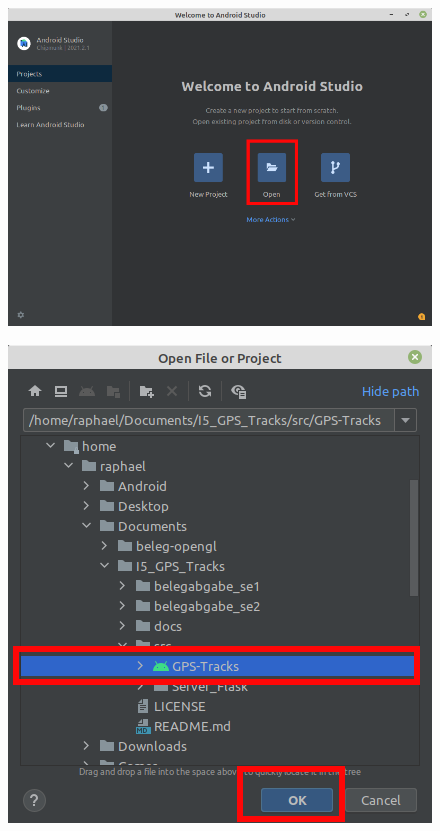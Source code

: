\documentclass{article}
\begin{document}
\begin{enumerate}
        \begin{minipage}{0.6\textwidth}
        \begin{figure}[H]
            \includegraphics[scale=0.3]{8.png}
        \end{figure}
        \end{minipage}
        \begin{minipage}{0.4\textwidth}
        \begin{figure}[H]
            \includegraphics[scale=0.38]{9.png}
        \end{figure}
        \end{minipage}
        

\end{enumerate}
\end{document}
